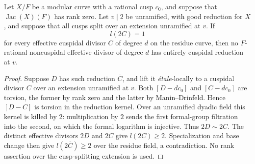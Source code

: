 \begin{lemma}\label{lem:octic-doubled-cuspidal-RR}
Let $X/F$ be a modular curve with a rational cusp $c_0$,
and suppose that $\operatorname{Jac}(X)(F)$ has rank zero.
Let $v\mid2$ be unramified, with good reduction for $X$, and
suppose that all cusps split over an extension unramified at $v$.
If
\[
 l(2C)=1
\]
for every effective cuspidal divisor $C$ of degree $d$ on
the residue curve, then no $F$-rational noncuspidal effective
divisor of degree $d$ has entirely cuspidal reduction at $v$.
\end{lemma}
\begin{proof}
Suppose $D$ has such reduction $\overline C$, and lift it
\emph{\'etale}-locally to a cuspidal divisor $C$ over an
extension unramified at $v$. Both $[D-dc_0]$ and $[C-dc_0]$
are torsion, the former by rank zero and the latter by
Manin--Drinfeld. Hence $[D-C]$ is torsion in the reduction
kernel. Over an unramified dyadic field this kernel is killed
by $2$: multiplication by $2$ sends the first formal-group
filtration into the second, on which the formal logarithm
is injective. Thus $2D\sim2C$.
The distinct effective divisors $2D$ and $2C$ give
$l(2C)\geq2$. Specialization and base change then give
$l(2\overline C)\geq2$ over the residue field, a contradiction.
No rank assertion over the cusp-splitting extension is used.
\end{proof}

